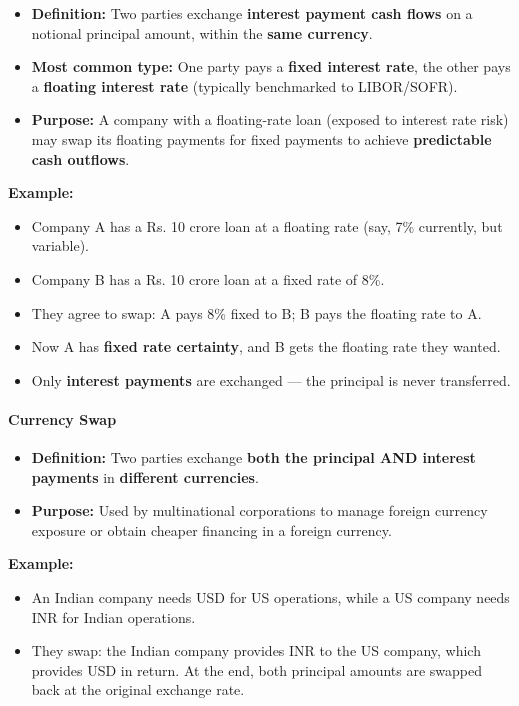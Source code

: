 \documentclass[12pt,openany]{book}
\begin{document}
\begin{itemize}[leftmargin=*]
    \item \textbf{Definition:} Two parties exchange \textbf{interest payment cash flows} on a notional principal amount, within the \textbf{same currency}.
    \item \textbf{Most common type:} One party pays a \textbf{fixed interest rate}, the other pays a \textbf{floating interest rate} (typically benchmarked to LIBOR/SOFR).
    \item \textbf{Purpose:} A company with a floating-rate loan (exposed to interest rate risk) may swap its floating payments for fixed payments to achieve \textbf{predictable cash outflows}.
\end{itemize}

\textbf{Example:}
\begin{itemize}[leftmargin=*]
    \item Company A has a Rs. 10 crore loan at a floating rate (say, 7\% currently, but variable).
    \item Company B has a Rs. 10 crore loan at a fixed rate of 8\%.
    \item They agree to swap: A pays 8\% fixed to B; B pays the floating rate to A.
    \item Now A has \textbf{fixed rate certainty}, and B gets the floating rate they wanted.
    \item Only \textbf{interest payments} are exchanged --- the principal is never transferred.
\end{itemize}

\paragraph{Currency Swap}

\begin{itemize}[leftmargin=*]
    \item \textbf{Definition:} Two parties exchange \textbf{both the principal AND interest payments} in \textbf{different currencies}.
    \item \textbf{Purpose:} Used by multinational corporations to manage foreign currency exposure or obtain cheaper financing in a foreign currency.
\end{itemize}

\textbf{Example:}
\begin{itemize}[leftmargin=*]
    \item An Indian company needs USD for US operations, while a US company needs INR for Indian operations.
    \item They swap: the Indian company provides INR to the US company, which provides USD in return. At the end, both principal amounts are swapped back at the original exchange rate.
\end{itemize}
\end{document}
